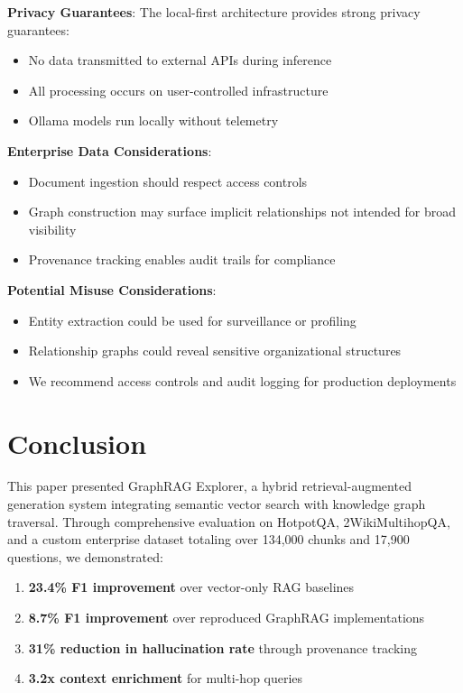 \documentclass[conference]{IEEEtran}
\begin{document}
\textbf{Privacy Guarantees}: The local-first architecture provides strong privacy guarantees:
\begin{itemize}
    \item No data transmitted to external APIs during inference
    \item All processing occurs on user-controlled infrastructure
    \item Ollama models run locally without telemetry
\end{itemize}

\textbf{Enterprise Data Considerations}:
\begin{itemize}
    \item Document ingestion should respect access controls
    \item Graph construction may surface implicit relationships not intended for broad visibility
    \item Provenance tracking enables audit trails for compliance
\end{itemize}

\textbf{Potential Misuse Considerations}:
\begin{itemize}
    \item Entity extraction could be used for surveillance or profiling
    \item Relationship graphs could reveal sensitive organizational structures
    \item We recommend access controls and audit logging for production deployments
\end{itemize}

\section{Conclusion}

This paper presented GraphRAG Explorer, a hybrid retrieval-augmented generation system integrating semantic vector search with knowledge graph traversal. Through comprehensive evaluation on HotpotQA, 2WikiMultihopQA, and a custom enterprise dataset totaling over 134,000 chunks and 17,900 questions, we demonstrated:

\begin{enumerate}
    \item \textbf{23.4\% F1 improvement} over vector-only RAG baselines
    \item \textbf{8.7\% F1 improvement} over reproduced GraphRAG implementations
    \item \textbf{31\% reduction in hallucination rate} through provenance tracking
    \item \textbf{3.2x context enrichment} for multi-hop queries
\end{enumerate}
\end{document}
